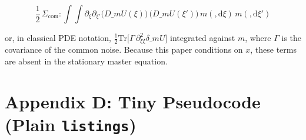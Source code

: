 \documentclass[11pt,letterpaper,oneside]{article}
\numberwithin{equation}{section}
\newcommand{\1}{\mathbf{1}}
\newcommand{\diff}{,\mathrm{d}}
\newcommand{\dmU}{\delta\_m U}
\newcommand{\Dm}{D\_m}
\begin{document}
$$
\frac{1}{2}\,\Sigma_{\mathrm{com}}:\!\int\!\!\int
\partial_{\xi}\partial_{\xi'} \big(\Dm U(\xi)\big)\,\big(\Dm U(\xi')\big)
\, m(\diff \xi)\, m(\diff \xi')
$$

or, in classical PDE notation,
$\tfrac12 \mathrm{Tr}\big[\Gamma\,\partial_{\xi\xi}^2 \dmU\big]$
integrated against $m$, where $\Gamma$ is the covariance of the common noise. Because this paper conditions on $x$, these terms are absent in the stationary master equation.

\section{Appendix D: Tiny Pseudocode (Plain \texorpdfstring{\texttt{listings}}{listings})}\label{app:code}

\lstset{
basicstyle=\ttfamily\small,
columns=fullflexible,
showstringspaces=false,
frame=single,
framerule=0.4pt,
breaklines=true,
tabsize=2,
captionpos=b
}
\end{document}
